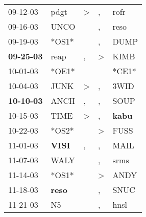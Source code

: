 \begin{supertabular}{p{0.07\textwidth}p{0.06\textwidth}p{0.02\textwidth}p{0.02\textwidth}p{0.06\textwidth}}
          09-12-03\textsuperscript{} &           pdgt\textsuperscript{} &     \textgreater &                , &           rofr\textsuperscript{} \\
          09-16-03\textsuperscript{} &           UNCO\textsuperscript{} &                  &                , &           reso\textsuperscript{} \\
          09-19-03\textsuperscript{} &                            *OS1* &                  &                , &           DUMP\textsuperscript{} \\
 \textbf{09-25-03\textsuperscript{}} &           reap\textsuperscript{} &                , &     \textgreater &           KIMB\textsuperscript{} \\
          10-01-03\textsuperscript{} &                            *OE1* &                  &                  &                            *CE1* \\
          10-04-03\textsuperscript{} &           JUNK\textsuperscript{} &     \textgreater &                , &           3WID\textsuperscript{} \\
 \textbf{10-10-03\textsuperscript{}} &           ANCH\textsuperscript{} &                , &                , &           SOUP\textsuperscript{} \\
          10-15-03\textsuperscript{} &           TIME\textsuperscript{} &     \textgreater &                , &  \textbf{kabu\textsuperscript{}} \\
          10-22-03\textsuperscript{} &                            *OS2* &                  &     \textgreater &           FUSS\textsuperscript{} \\
          11-01-03\textsuperscript{} &  \textbf{VISI\textsuperscript{}} &                , &                , &           MAIL\textsuperscript{} \\
          11-07-03\textsuperscript{} &           WALY\textsuperscript{} &                  &                , &           srms\textsuperscript{} \\
          11-14-03\textsuperscript{} &                            *OS1* &                  &     \textgreater &           ANDY\textsuperscript{} \\
          11-18-03\textsuperscript{} &  \textbf{reso\textsuperscript{}} &                  &                , &           SNUC\textsuperscript{} \\
          11-21-03\textsuperscript{} &             N5\textsuperscript{} &                  &                , &           hnsl\textsuperscript{} \\

\end{supertabular}
